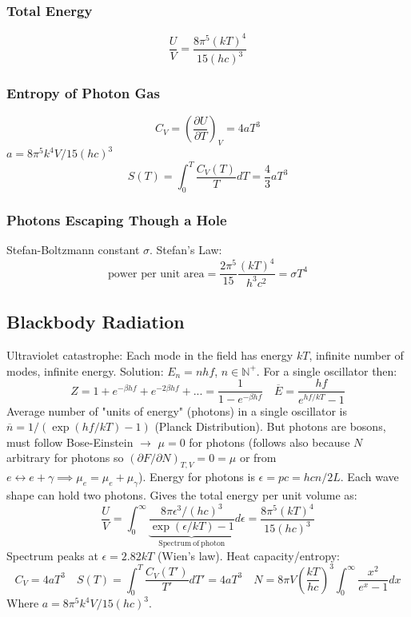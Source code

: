 \documentclass[a4paper,norsk, 10pt]{article}
\newcommand{\pd}[3]{\left(\frac{\partial #1}{\partial #2}\right)_{#3}}
\begin{document}
\subsubsection{Total Energy}
\begin{equation}
\frac{U}{V} = \frac{8\pi^5(kT)^4}{15(hc)^3}
\end{equation}
\subsubsection{Entropy of Photon Gas}
\begin{equation}
C_V = \pd{U}{T}{V} = 4aT^3
\end{equation}
$a = 8\pi^5k^4V/15(hc)^3$
\begin{equation}
S(T) = \int_0^T\frac{C_V(T)}{T}dT = \frac{4}{3}aT^3
\end{equation}
\subsubsection{Photons Escaping Though a Hole}
Stefan-Boltzmann constant $\sigma$. Stefan's Law:
\begin{equation}
\text{power per unit area} = \frac{2\pi^5}{15}\frac{(kT)^4}{h^3c^2} = \sigma T^4
\end{equation}
\subsection{Blackbody Radiation}
Ultraviolet catastrophe: Each mode in the field has energy $kT$, infinite number of modes, infinite energy. Solution: $E_n=nhf$, $n\in \mathbb{N}^+$. For a single oscillator then:
\begin{equation}
Z=1+e^{-\beta hf}+e^{-2\beta hf}+...=\frac{1}{1-e^{-\beta hf}}\quad \overline{E}=\frac{hf}{e^{hf/kT}-1}
\end{equation}
Average number of "units of energy" (photons) in a single oscillator is $\overline{n}=1/(\exp(hf/kT)-1)$ (Planck Distribution). But photons are bosons, must follow Bose-Einstein $\rightarrow$ $\mu=0$ for photons (follows also because $N$ arbitrary for photons so $(\partial F/\partial N)_{T,V}=0=\mu$ or from $e\leftrightarrow e+\gamma \implies \mu_e=\mu_e+\mu_{\gamma}$). Energy for photons is $\epsilon=pc=hcn/2L$. Each wave shape can hold two photons. Gives the total energy per unit volume as:
\begin{equation}
\frac{U}{V}=\int_0^{\infty} \underbrace{\frac{8\pi \epsilon^3/(hc)^3}{\exp(\epsilon/kT)-1}}_{\mathrm{Spectrum\ of\ photon}} d\epsilon = \frac{8\pi^5(kT)^4}{15 (hc)^3}
\end{equation}
Spectrum peaks at $\epsilon=2.82 kT$ (Wien's law). Heat capacity/entropy:
\begin{equation}
C_V=4aT^3 \quad S(T)=\int_0^T \frac{C_V(T')}{T'}dT'=4aT^3 \quad N=8\pi V\left(\frac{kT}{hc}\right)^3 \int_0^{\infty} \frac{x^2}{e^x-1}dx
\end{equation}
Where $a=8\pi^5k^4V/15(hc)^3$.
\end{document}
